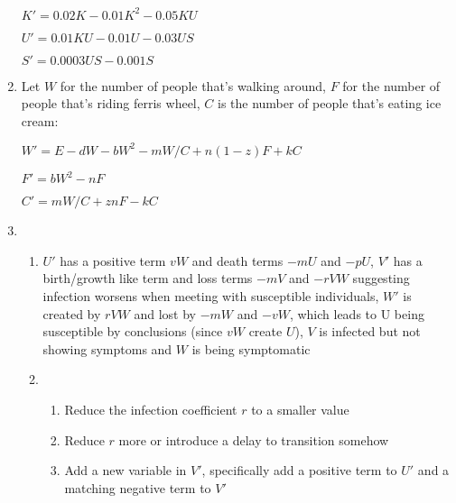 \documentclass[12pt]{article}
\begin{document}
\begin{enumerate}
    $K' = 0.02K - 0.01K^2 - 0.05KU$
    
    $U' = 0.01KU - 0.01U - 0.03US$
    
    $S' = 0.0003US - 0.001S$
    \item Let $W$ for the number of people that's walking around, $F$ for the number of people that's riding ferris wheel, $C$ is the number of people that's eating ice cream:
    
    $W' = E - dW - bW^2 - mW/C + n(1-z)F + kC$

    $F' = bW^2 - nF$

    $C' = mW/C + znF - kC$
    \item \begin{enumerate}[label=\alph*.]
        \item $U'$ has a positive term $vW$ and death terms $-mU$ and $-pU$, $V'$ has a birth/growth like term and loss terms $-mV$ and $-rVW$ suggesting infection worsens when meeting with susceptible individuals, $W'$ is created by $rVW$ and lost by $-mW$ and $-vW$, which leads to U being susceptible by conclusions (since $vW$ create $U$), $V$ is infected but not showing symptoms and $W$ is being symptomatic
        \item \begin{enumerate}[label=\roman*.]
            \item Reduce the infection coefficient $r$ to a smaller value 
            \item Reduce $r$ more or introduce a delay to transition somehow
            \item Add a new variable in $V'$, specifically add a positive term to $U'$ and a matching negative term to $V'$
        \end{enumerate}
    \end{enumerate}
\end{enumerate}
\end{document}
